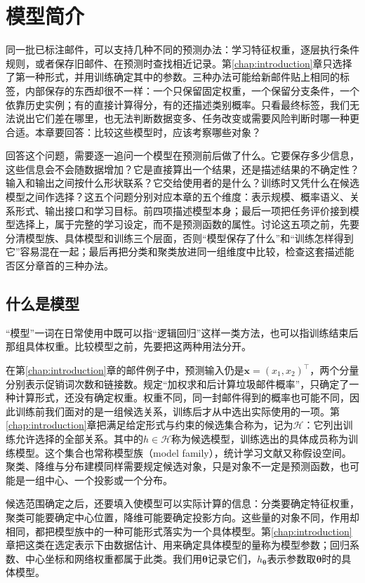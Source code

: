 \chapter{模型简介}
\label{chap:machine-learning-models}

同一批已标注邮件，可以支持几种不同的预测办法：学习特征权重，逐层执行条件规则，或者保存旧邮件、在预测时查找相近记录。第\ref{chap:introduction}章只选择了第一种形式，并用训练确定其中的参数。三种办法可能给新邮件贴上相同的标签，内部保存的东西却很不一样：一个只保留固定权重，一个保留分支条件，一个依靠历史实例；有的直接计算得分，有的还描述类别概率。只看最终标签，我们无法说出它们差在哪里，也无法判断数据变多、任务改变或需要风险判断时哪一种更合适。本章要回答：比较这些模型时，应该考察哪些对象？

回答这个问题，需要逐一追问一个模型在预测前后做了什么。它要保存多少信息，这些信息会不会随数据增加？它是直接算出一个结果，还是描述结果的不确定性？输入和输出之间按什么形状联系？它交给使用者的是什么？训练时又凭什么在候选模型之间作选择？这五个问题分别对应本章的五个维度：表示规模、概率语义、关系形式、输出接口和学习目标。前四项描述模型本身；最后一项把任务评价接到模型选择上，属于完整的学习设定，而不是预测函数的属性。讨论这五项之前，先要分清模型族、具体模型和训练三个层面，否则“模型保存了什么”和“训练怎样得到它”容易混在一起；最后再把分类和聚类放进同一组维度中比较，检查这套描述能否区分章首的三种办法。

\section{什么是模型}
\label{sec:models-meaning}

“模型”一词在日常使用中既可以指“逻辑回归”这样一类方法，也可以指训练结束后那组具体权重。比较模型之前，先要把这两种用法分开。

在第\ref{chap:introduction}章的邮件例子中，预测输入仍是$\bm{x}=(x_1,x_2)^{\top}$，两个分量分别表示促销词次数和链接数。规定“加权求和后计算垃圾邮件概率”，只确定了一种计算形式，还没有确定权重。权重不同，同一封邮件得到的概率也可能不同，因此训练前我们面对的是一组候选关系，训练后才从中选出实际使用的一项。第\ref{chap:introduction}章把满足给定形式与约束的候选集合称为，记为$\mathcal{H}$：它列出训练允许选择的全部关系。其中的$h\in\mathcal{H}$称为候选模型，训练选出的具体成员称为训练模型。这个集合也常称模型族（model family），统计学习文献又称假设空间。聚类、降维与分布建模同样需要规定候选对象，只是对象不一定是预测函数，也可能是一组中心、一个投影或一个分布。

候选范围确定之后，还要填入使模型可以实际计算的信息：分类要确定特征权重，聚类可能要确定中心位置，降维可能要确定投影方向。这些量的对象不同，作用却相同，都把模型族中的一种可能形式落实为一个具体模型。第\ref{chap:introduction}章把这类在选定表示下由数据估计、用来确定具体模型的量称为模型参数；回归系数、中心坐标和网络权重都属于此类。我们用$\bm{\theta}$记录它们，$h_{\bm{\theta}}$表示参数取$\bm{\theta}$时的具体模型。

